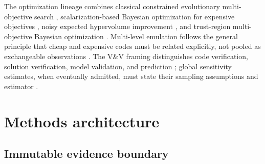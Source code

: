 \documentclass[11pt]{article}
\begin{document}
The optimization lineage combines classical constrained evolutionary
multi-objective search \cite{Deb2002}, scalarization-based Bayesian
optimization for expensive objectives \cite{Knowles2006}, noisy expected
hypervolume improvement \cite{Daulton2021}, and trust-region multi-objective
Bayesian optimization \cite{Daulton2022}. Multi-level emulation follows the
general principle that cheap and expensive codes must be related explicitly,
not pooled as exchangeable observations \cite{Kennedy2000}. The V\&V framing
distinguishes code verification, solution verification, model validation, and
prediction \cite{Oberkampf2002}; global sensitivity estimates, when eventually
admitted, must state their sampling assumptions and estimator
\cite{Saltelli2002}.

\section{Methods architecture}

\subsection{Immutable evidence boundary}
\end{document}

